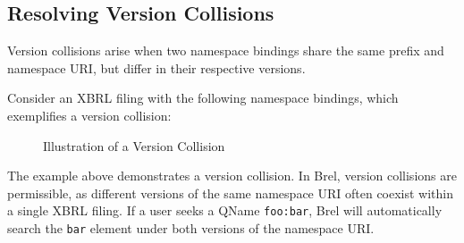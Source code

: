 

\subsection{Resolving Version Collisions}

Version collisions arise when two namespace bindings share the same prefix and namespace URI, but differ in their respective versions.

Consider an XBRL filing with the following namespace bindings, which exemplifies a version collision:

\begin{figure}[H]
\caption{Illustration of a Version Collision}
\label{fig:version_collision_example}
\end{figure}

The example above demonstrates a version collision.
In Brel, version collisions are permissible, as different versions of the same namespace URI often coexist within a single XBRL filing.
If a user seeks a QName \texttt{foo:bar}, Brel will automatically search the \texttt{bar} element under both versions of the namespace URI.




